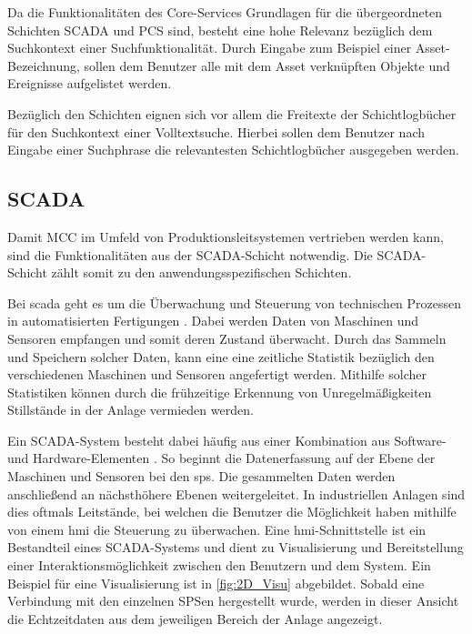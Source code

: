 Da die Funktionalitäten des Core-Services Grundlagen für die übergeordneten Schichten \glqq SCADA\grqq{} und \glqq PCS\grqq{} sind, besteht eine hohe Relevanz bezüglich dem Suchkontext einer Suchfunktionalität. Durch Eingabe zum Beispiel einer Asset-Bezeichnung, sollen dem Benutzer alle mit dem Asset verknüpften Objekte und Ereignisse aufgelistet werden.

Bezüglich den Schichten eignen sich vor allem die Freitexte der Schichtlogbücher für den Suchkontext einer Volltextsuche. Hierbei sollen dem Benutzer nach Eingabe einer Suchphrase die relevantesten Schichtlogbücher ausgegeben werden.

\subsection{SCADA\label{subsec3.1.3:Unterunterpunkt-3}}

Damit MCC im Umfeld von Produktionsleitsystemen vertrieben werden kann, sind die Funktionalitäten aus der \glqq SCADA\grqq{}-Schicht notwendig. Die \glqq SCADA\grqq{}-Schicht zählt somit zu den anwendungsspezifischen Schichten.

Bei \gls{scada} geht es um die Überwachung und Steuerung von technischen Prozessen in automatisierten Fertigungen \cite{ColeWangsness.2020}. Dabei werden Daten von Maschinen und Sensoren empfangen und somit deren Zustand überwacht. Durch das Sammeln und Speichern solcher Daten, kann eine eine zeitliche Statistik bezüglich den verschiedenen Maschinen und Sensoren angefertigt werden. Mithilfe solcher Statistiken können durch die frühzeitige Erkennung von Unregelmäßigkeiten Stillstände in der Anlage vermieden werden.

Ein SCADA-System besteht dabei häufig aus einer Kombination aus Software- und Hardware-Elementen \cite{copadata.com.2021}. So beginnt die Datenerfassung auf der Ebene der Maschinen und Sensoren bei den \gls{sps}. Die gesammelten Daten werden anschließend an nächsthöhere Ebenen weitergeleitet. In industriellen Anlagen sind dies oftmals Leitstände, bei welchen die Benutzer die Möglichkeit haben mithilfe von einem \gls{hmi} die Steuerung zu überwachen. Eine \gls{hmi}-Schnittstelle ist ein Bestandteil eines SCADA-Systems und dient zu Visualisierung und Bereitstellung einer Interaktionsmöglichkeit zwischen den Benutzern und dem System. Ein Beispiel für eine Visualisierung ist in \autoref{fig:2D_Visu} abgebildet. Sobald eine Verbindung mit den einzelnen SPSen hergestellt wurde, werden in dieser Ansicht die Echtzeitdaten aus dem jeweiligen Bereich der Anlage angezeigt.

